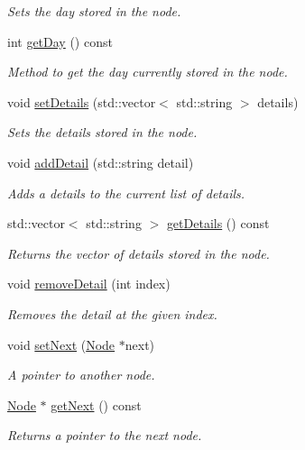\begin{DoxyCompactItemize}
\begin{DoxyCompactList}\small\item\em Sets the day stored in the node. \end{DoxyCompactList}\item 
int \hyperlink{class_node_a73aa0f295caeb4106319ebb8d6c9f9d8}{get\+Day} () const
\begin{DoxyCompactList}\small\item\em Method to get the day currently stored in the node. \end{DoxyCompactList}\item 
void \hyperlink{class_node_a9541a5a3f82ea381417dcfe36c3844a6}{set\+Details} (std\+::vector$<$ std\+::string $>$ details)
\begin{DoxyCompactList}\small\item\em Sets the details stored in the node. \end{DoxyCompactList}\item 
void \hyperlink{class_node_a0f18850ca6a3b31325924e747003e3ce}{add\+Detail} (std\+::string detail)
\begin{DoxyCompactList}\small\item\em Adds a details to the current list of details. \end{DoxyCompactList}\item 
std\+::vector$<$ std\+::string $>$ \hyperlink{class_node_a264e8357261b6cc1c1969493b2b956d4}{get\+Details} () const
\begin{DoxyCompactList}\small\item\em Returns the vector of details stored in the node. \end{DoxyCompactList}\item 
void \hyperlink{class_node_a1f233dbcd9ecd73c194b4e629ff08564}{remove\+Detail} (int index)
\begin{DoxyCompactList}\small\item\em Removes the detail at the given index. \end{DoxyCompactList}\item 
void \hyperlink{class_node_ae0062432733265c491000494625c3a04}{set\+Next} (\hyperlink{class_node}{Node} $\ast$next)
\begin{DoxyCompactList}\small\item\em A pointer to another node. \end{DoxyCompactList}\item 
\hyperlink{class_node}{Node} $\ast$ \hyperlink{class_node_a7207ac6b9786567730715f0d2a230764}{get\+Next} () const
\begin{DoxyCompactList}\small\item\em Returns a pointer to the next node. \end{DoxyCompactList}\item 

\end{DoxyCompactItemize}
